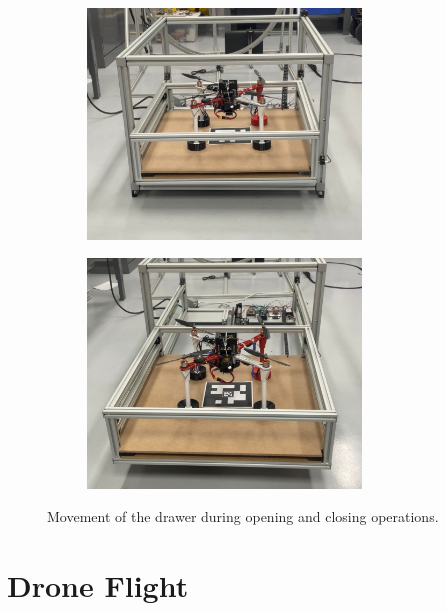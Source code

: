 \begin{figure}[H]
    \centering
    \begin{subfigure}[H]{0.45\textwidth}
        \centering
        \includegraphics[width=0.8\textwidth]{pictures/drawer_open.jpeg}
        \label{fig:drawer_open}
    \end{subfigure}
    \begin{subfigure}[H]{0.45\textwidth}
        \centering
        \includegraphics[width=0.8\textwidth]{pictures/drawer_closed.jpeg}
        \label{fig:drawer_closed}
    \end{subfigure}
    \caption{Movement of the drawer during opening and closing operations.}
    \label{fig:drawer_movement}
\end{figure}

\section{Drone Flight}

